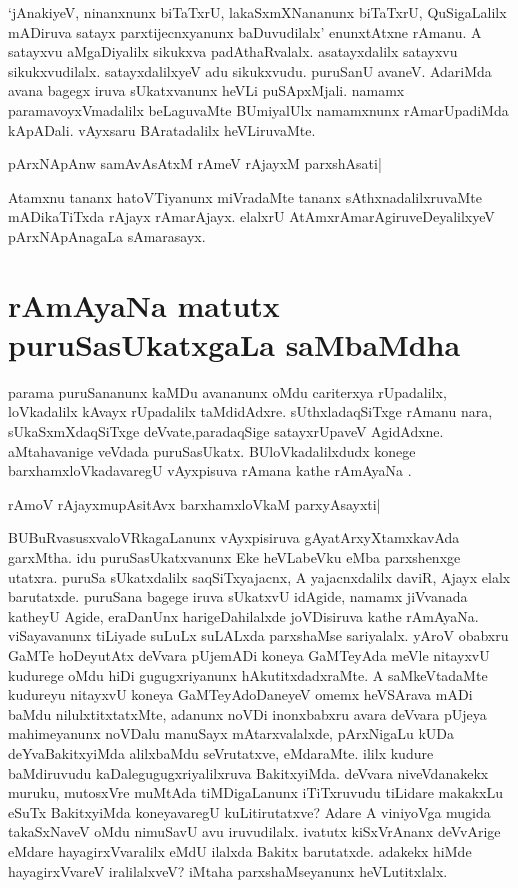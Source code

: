 `jAnakiyeV, ninanxnunx biTaTxrU, lakaSxmXNananunx biTaTxrU, QuSigaLalilx mADiruva satayx parxtijecnxyanunx  baDuvudilalx' enunxtAtxne rAmanu. A satayxvu aMgaDiyalilx sikukxva padAthaRvalalx. asatayxdalilx satayxvu sikukxvudilalx. satayxdalilxyeV adu sikukxvudu. puruSanU avaneV. AdariMda avana bagegx iruva sUkatxvanunx heVLi puSApxMjali. namamx paramavoyxVmadalilx beLaguvaMte BUmiyalUlx namamxnunx rAmarUpadiMda kApADali. vAyxsaru BAratadalilx heVLiruvaMte.

\begin{shloka}
pArxNApAnw samAvAsAtxM rAmeV rAjayxM parxshAsati|\label{253}
\end{shloka}

Atamxnu tananx hatoVTiyanunx miVradaMte tananx sAthxnadalilxruvaMte mADikaTiTxda rAjayx rAmarAjayx. elalxrU AtAmxrAmarAgiruveDeyalilxyeV pArxNApAnagaLa sAmarasayx. 

\section*{rAmAyaNa matutx puruSasUkatxgaLa saMbaMdha}

parama puruSananunx kaMDu avananunx oMdu cariterxya rUpadalilx, loVkadalilx kAvayx rUpadalilx taMdidAdxre. sUthxladaqSiTxge rAmanu nara, sUkaSxmXdaqSiTxge deVvate,paradaqSige satayxrUpaveV AgidAdxne. aMtahavanige veVdada puruSasUkatx. BUloVkadalilxdudx konege barxhamxloVkadavaregU vAyxpisuva rAmana kathe rAmAyaNa . 

\begin{shloka}
rAmoV rAjayxmupAsitAvx barxhamxloVkaM parxyAsayxti|\label{253a}
\end{shloka}

BUBuRvasusxvaloVRkagaLanunx vAyxpisiruva gAyatArxyXtamxkavAda garxMtha. idu puruSasUkatxvanunx Eke heVLabeVku eMba parxshenxge utatxra. puruSa sUkatxdalilx saqSiTxyajacnx, A yajacnxdalilx daviR, Ajayx elalx barutatxde. puruSana bagege iruva sUkatxvU idAgide, namamx jiVvanada katheyU Agide, eraDanUnx harigeDahilalxde joVDisiruva kathe rAmAyaNa. viSayavanunx tiLiyade suLuLx suLALxda parxshaMse sariyalalx. yAroV obabxru GaMTe hoDeyutAtx deVvara pUjemADi koneya GaMTeyAda meVle nitayxvU kudurege oMdu hiDi gugugxriyanunx hAkutitxdadxraMte. A saMkeVtadaMte kudureyu nitayxvU koneya GaMTeyAdoDaneyeV omemx heVSArava mADi baMdu nilulxtitxtatxMte, adanunx noVDi inonxbabxru avara deVvara pUjeya mahimeyanunx noVDalu manuSayx mAtarxvalalxde, pArxNigaLu kUDa deYvaBakitxyiMda alilxbaMdu seVrutatxve, eMdaraMte. ililx kudure baMdiruvudu kaDalegugugxriyalilxruva BakitxyiMda. deVvara niveVdanakekx muruku, mutosxVre muMtAda tiMDigaLanunx iTiTxruvudu tiLidare makakxLu eSuTx BakitxyiMda koneyavaregU kuLitirutatxve? Adare A viniyoVga mugida takaSxNaveV oMdu nimuSavU avu iruvudilalx. ivatutx kiSxVrAnanx deVvArige eMdare hayagirxVvaralilx eMdU ilalxda Bakitx barutatxde. adakekx hiMde hayagirxVvareV iralilalxveV? iMtaha parxshaMseyanunx heVLutitxlalx. 

